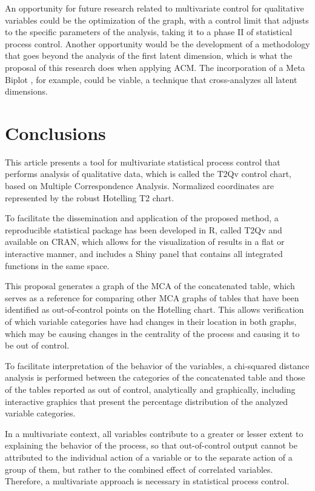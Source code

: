 \documentclass[mathematics,article,submit,moreauthors,pdftex]{mdpi}
\begin{document}
An opportunity for future research related to multivariate control for
qualitative variables could be the optimization of the graph, with a
control limit that adjusts to the specific parameters of the analysis,
taking it to a phase II of statistical process control. Another
opportunity would be the development of a methodology that goes beyond
the analysis of the first latent dimension, which is what the proposal
of this research does when applying ACM. The incorporation of a Meta
Biplot \citep{galindojk}, for example, could be viable, a technique that
cross-analyzes all latent dimensions.

\hypertarget{conclusions}{%
\section{Conclusions}\label{conclusions}}

This article presents a tool for multivariate statistical process
control that performs analysis of qualitative data, which is called the
T2Qv control chart, based on Multiple Correspondence Analysis.
Normalized coordinates are represented by the robust Hotelling T2 chart.

To facilitate the dissemination and application of the proposed method,
a reproducible statistical package has been developed in R, called T2Qv
and available on CRAN, which allows for the visualization of results in
a flat or interactive manner, and includes a Shiny panel that contains
all integrated functions in the same space.

This proposal generates a graph of the MCA of the concatenated table,
which serves as a reference for comparing other MCA graphs of tables
that have been identified as out-of-control points on the Hotelling
chart. This allows verification of which variable categories have had
changes in their location in both graphs, which may be causing changes
in the centrality of the process and causing it to be out of control.

To facilitate interpretation of the behavior of the variables, a
chi-squared distance analysis is performed between the categories of the
concatenated table and those of the tables reported as out of control,
analytically and graphically, including interactive graphics that
present the percentage distribution of the analyzed variable categories.

In a multivariate context, all variables contribute to a greater or
lesser extent to explaining the behavior of the process, so that
out-of-control output cannot be attributed to the individual action of a
variable or to the separate action of a group of them, but rather to the
combined effect of correlated variables. Therefore, a multivariate
approach is necessary in statistical process control.
\end{document}
